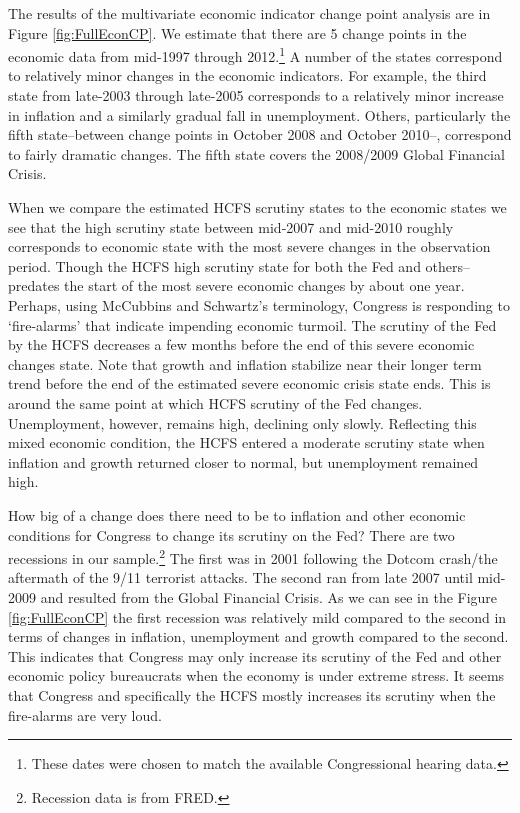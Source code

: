 \documentclass[a4paper]{article}\usepackage[]{graphicx}\usepackage[]{color}
\begin{document}
The results of the multivariate economic indicator change point analysis are in Figure \ref{fig:FullEconCP}. We estimate that there are 5 change points in the economic data from mid-1997 through 2012.\footnote{These dates were chosen to match the available Congressional hearing data.} A number of the states correspond to relatively minor changes in the economic indicators. For example, the third state from late-2003 through late-2005 corresponds to a relatively minor increase in inflation and a similarly gradual fall in unemployment. Others, particularly the fifth state--between change points in October 2008 and October 2010--, correspond to fairly dramatic changes. The fifth state covers the 2008/2009 Global Financial Crisis.

When we compare the estimated HCFS scrutiny states to the economic states we see that the high scrutiny state between mid-2007 and mid-2010 roughly corresponds to economic state with the most severe changes in the observation period. Though the HCFS high scrutiny state for both the Fed and others--predates the start of the most severe economic changes by about one year. Perhaps, using McCubbins and Schwartz's \citeyearpar{Mccubbins1984} terminology, Congress is responding to `fire-alarms' that indicate impending economic turmoil. The scrutiny of the Fed by the HCFS decreases a few months before the end of this severe economic changes state. Note that growth and inflation stabilize near their longer term trend before the end of the estimated severe economic crisis state ends. This is around the same point at which HCFS scrutiny of the Fed changes. Unemployment, however, remains high, declining only slowly. Reflecting this mixed economic condition, the HCFS entered a moderate scrutiny state when inflation and growth returned closer to normal, but unemployment remained high.

How big of a change does there need to be to inflation and other economic conditions for Congress to change its scrutiny on the Fed? There are two recessions in our sample.\footnote{Recession data is from FRED.} The first was in 2001 following the Dotcom crash/the aftermath of the 9/11 terrorist attacks. The second ran from late 2007 until mid-2009 and resulted from the Global Financial Crisis. As we can see in the Figure \ref{fig:FullEconCP} the first recession was relatively mild compared to the second in terms of changes in inflation, unemployment and growth compared to the second. This indicates that Congress may only increase its scrutiny of the Fed and other economic policy bureaucrats when the economy is under extreme stress. It seems that Congress and specifically the HCFS mostly increases its scrutiny when the fire-alarms are very loud.
\end{document}
